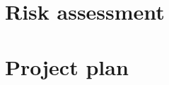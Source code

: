 \documentclass[sigconf,authordraft]{acmart}
\begin{document}
\section{Risk assessment}
	
	
\section{Project plan}


 

 




 
\end{document}

